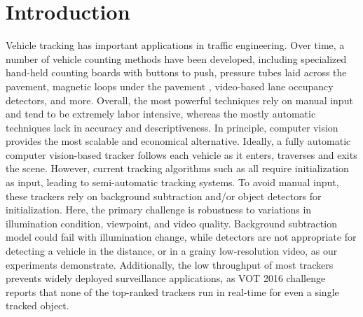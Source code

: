 \section{Introduction}
\label{sec:tracker-intro}

Vehicle tracking has important applications in traffic engineering.
Over time, a number of vehicle counting methods have been developed, including specialized hand-held counting boards with buttons to push, pressure tubes laid across the pavement, magnetic loops under the pavement 
\cite{klein2006traffic,mimbela2000summary},
video-based lane occupancy detectors, 
and more. Overall, the most powerful techniques rely on manual input and tend to be extremely labor intensive, whereas the mostly automatic techniques lack in accuracy and descriptiveness.
In principle, computer vision provides the most scalable and economical alternative. Ideally, a fully automatic computer vision-based tracker follows each vehicle as it enters, traverses and exits the scene.
However, current tracking algorithms such as \cite{henriques2015high,vojir2014robust,hare2011struck,possegger2015defense} all require initialization as input, leading to semi-automatic tracking systems. To avoid manual input, these trackers rely on background subtraction and/or object detectors for initialization. Here, the primary challenge is robustness to variations in illumination condition, viewpoint, and video quality. Background subtraction model could fail with illumination change, while detectors are not appropriate for detecting a vehicle in the distance, or in a grainy low-resolution video, as our experiments demonstrate. Additionally, the low throughput of most trackers prevents widely deployed surveillance applications, as VOT 2016 challenge reports that none of the top-ranked trackers run in real-time for even a single tracked object.


